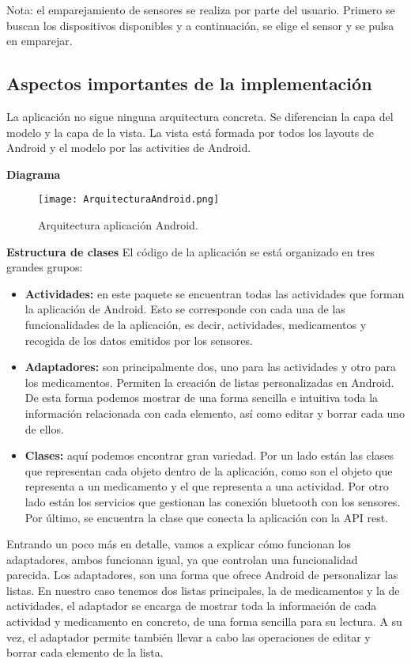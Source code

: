 \documentclass[11pt,spanish]{article}
\begin{document}
Nota: el emparejamiento de sensores se realiza por parte del usuario. Primero se buscan los dispositivos disponibles y a continuación, se elige el sensor y se pulsa en emparejar.
\newpage

\subsection{Aspectos importantes de la implementación}
La aplicación no sigue ninguna arquitectura concreta. Se diferencian la capa del modelo y la capa de la vista. La vista está formada por todos los layouts de Android y el modelo por las activities de Android.
\newline

{\bf Diagrama}
\begin{figure}[h!]
  \centering
  \texttt{[image: ArquitecturaAndroid.png]}
  \caption{Arquitectura aplicación Android.}
\end{figure}

{\bf Estructura de clases}
\newline
\newline
El código de la aplicación se está organizado en tres grandes grupos:

\begin{itemize}
	\item {\bf Actividades: } en este paquete se encuentran todas las actividades que forman la aplicación de Android. Esto se corresponde con cada una de las funcionalidades de la aplicación, es decir, actividades, medicamentos y recogida de los datos emitidos por los sensores.
    \item {\bf Adaptadores: } son principalmente dos, uno para las actividades y otro para los medicamentos. Permiten la creación de listas personalizadas en Android. De esta forma podemos mostrar de una forma sencilla e intuitiva toda la información relacionada con cada elemento, así como editar y borrar cada uno de ellos.
    \item {\bf Clases: } aquí podemos encontrar gran variedad. Por un lado están las clases que representan cada objeto dentro de la aplicación, como son el objeto que representa a un medicamento y el que representa a una actividad. Por otro lado están los servicios que gestionan las conexión bluetooth con los sensores. Por último, se encuentra la clase que conecta la aplicación con la API rest.
\newline
\end{itemize}

Entrando un poco más en detalle, vamos a explicar cómo funcionan los adaptadores, ambos funcionan igual, ya que controlan una funcionalidad parecida. Los adaptadores, son una forma que ofrece Android de personalizar las listas. En nuestro caso tenemos dos listas principales, la de medicamentos y la de actividades, el adaptador se encarga de mostrar toda la información de cada actividad y medicamento en concreto, de una forma sencilla para su lectura. A su vez, el adaptador permite también llevar a cabo las operaciones de editar y borrar cada elemento de la lista.
\newline
\end{document}
